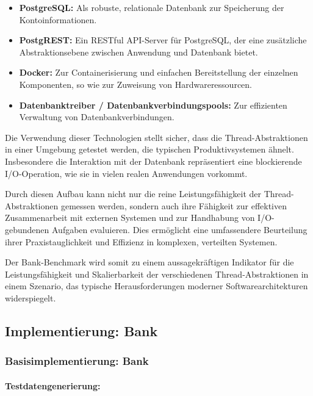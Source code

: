 \documentclass[fontsize=12pt,paper=a4,twoside=semi,parskip=half-,headsepline,headinclude]{scrreprt}
\begin{document}
\begin{itemize}
	\item \textbf{PostgreSQL:} Als robuste, relationale Datenbank zur Speicherung der Kontoinformationen.
	\item \textbf{PostgREST:} Ein RESTful API-Server für PostgreSQL, der eine zusätzliche Abstraktionsebene zwischen Anwendung und Datenbank bietet.
	\item \textbf{Docker:} Zur Containerisierung und einfachen Bereitstellung der einzelnen Komponenten, so wie zur Zuweisung von Hardwareressourcen.
	\item \textbf{Datenbanktreiber / Datenbankverbindungspools:} Zur effizienten Verwaltung von Datenbankverbindungen.
\end{itemize}

Die Verwendung dieser Technologien stellt sicher, dass die Thread-Abstraktionen in einer Umgebung getestet werden, die typischen Produktivsystemen ähnelt. Insbesondere die Interaktion mit der Datenbank repräsentiert eine blockierende I/O-Operation, wie sie in vielen realen Anwendungen vorkommt.

Durch diesen Aufbau kann nicht nur die reine Leistungsfähigkeit der Thread-Abstraktionen gemessen werden, sondern auch ihre Fähigkeit zur effektiven Zusammenarbeit mit externen Systemen und zur Handhabung von I/O-gebundenen Aufgaben evaluieren. Dies ermöglicht eine umfassendere Beurteilung ihrer Praxistauglichkeit und Effizienz in komplexen, verteilten Systemen.

Der Bank-Benchmark wird somit zu einem aussagekräftigen Indikator für die Leistungsfähigkeit und Skalierbarkeit der verschiedenen Thread-Abstraktionen in einem Szenario, das typische Herausforderungen moderner Softwarearchitekturen widerspiegelt.

\subsection{Implementierung: Bank}

\subsubsection{Basisimplementierung: Bank}

\paragraph{Testdatengenerierung:}
\label{para:datagenerator}
\end{document}
